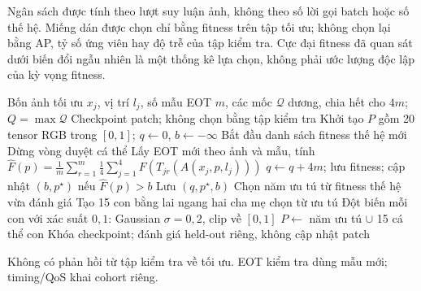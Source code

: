 \documentclass[a4paper,fleqn]{cas-dc}
\begin{document}
Ngân sách được tính theo lượt suy luận ảnh, không theo số lời gọi batch hoặc số thế hệ. Miếng dán được chọn chỉ bằng fitness trên tập tối ưu; không chọn lại bằng AP, tỷ số ứng viên hay độ trễ của tập kiểm tra. Cực đại fitness đã quan sát dưới biến đổi ngẫu nhiên là một thống kê lựa chọn, không phải ước lượng độc lập của kỳ vọng fitness.

\begin{algorithm*}[t]
\caption{SG-GA and patch locking before independent evaluation.}
\label{alg:sg_ga}
\begin{algorithmic}[1]
\Require Bốn ảnh tối ưu $x_j$, vị trí $l_j$, số mẫu EOT $m$, các mốc $\mathcal Q$ dương, chia hết cho $4m$; $Q=\max\mathcal Q$
\Ensure Checkpoint patch; không chọn bằng tập kiểm tra
\State Khởi tạo $P$ gồm 20 tensor RGB trong $[0,1]$; $q\gets0$, $b\gets-\infty$
 \State Bắt đầu danh sách fitness thế hệ mới
   \State Dừng vòng duyệt cá thể \EndIf
  \State Lấy EOT mới theo ảnh và mẫu, tính
  \Statex $\displaystyle\widehat F(p)=\frac1m\sum_{r=1}^m\frac14\sum_{j=1}^4F(T_{jr}(A(x_j,p,l_j)))$
  \State $q\gets q+4m$; lưu fitness; cập nhật $(b,p^\star)$ nếu $\widehat F(p)>b$
   \State Lưu $(q,p^\star,b)$ \EndIf
 \EndFor
  \State Chọn năm ưu tú từ fitness thế hệ vừa đánh giá
  \State Tạo 15 con bằng lai ngang hai cha mẹ chọn từ ưu tú
  \State Đột biến mỗi con với xác suất $0{,}1$: Gaussian $\sigma=0{,}2$, clip về $[0,1]$
  \State $P\gets$ năm ưu tú $\cup$ 15 cá thể con
 \EndIf
\EndWhile
\State Khóa checkpoint; đánh giá held-out riêng, không cập nhật patch
\end{algorithmic}
\medskip\centering
{}
\par\smallskip\footnotesize Không có phản hồi từ tập kiểm tra về tối ưu. EOT kiểm tra dùng mẫu mới; timing/QoS khai cohort riêng.
\end{algorithm*}
\end{document}
